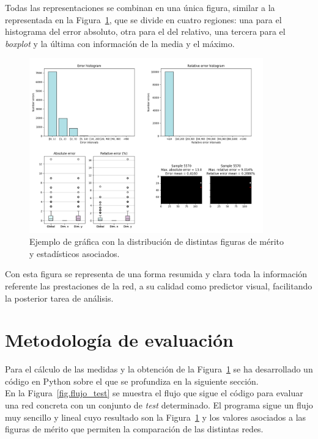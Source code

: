 \begin{description}
Todas las representaciones se combinan en una única figura, similar a la representada en la Figura~\ref{fig.test_example}, que se divide en cuatro regiones: una para el histograma del error absoluto, otra para el del relativo, una tercera para el \textit{boxplot} y la última con información de la media y el máximo. 

\begin{figure}[H]
		\begin{center}
			\includegraphics[width=0.9\textwidth]{ figures/error_stats_example.png}
			\caption{Ejemplo de gráfica con la distribución de distintas figuras de mérito y estadísticos asociados.}
			\label{fig.test_example}
		\end{center}
\end{figure}
\vspace{-10pt}

Con esta figura se representa de una forma resumida y clara toda la información referente las prestaciones de la red, a su calidad como predictor visual, facilitando la posterior tarea de análisis.
\vspace{10pt}
\end{description}

\section{Metodología de evaluación} \label{sec.eval}

Para el cálculo de las medidas  y la obtención de la Figura~\ref{fig.test_example} se ha desarrollado un código en Python sobre el que se profundiza en la siguiente sección.\\

En la Figura~\ref{fig.flujo_test} se muestra el flujo que sigue el código para evaluar una red concreta con un conjunto de \textit{test} determinado. El programa sigue un flujo muy sencillo y lineal cuyo resultado son la Figura~\ref{fig.test_example} y los valores asociados a las figuras de mérito que permiten la comparación de las distintas redes. 

